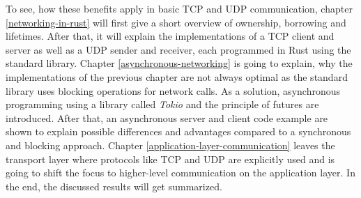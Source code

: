 To see, how these benefits apply in basic TCP and UDP communication, chapter \ref{networking-in-rust} will first give a
short overview of ownership, borrowing and lifetimes. After that, it will explain the implementations of a TCP client
and server as well as a UDP sender and receiver, each programmed in Rust using the standard library. Chapter
\ref{asynchronous-networking} is going to explain, why the implementations of the previous chapter are not always
optimal as the standard library uses blocking operations for network calls. As a solution, asynchronous programming
using a library called \textit{Tokio} and the principle of futures are introduced. After that, an asynchronous server
and client code example are shown to explain possible differences and advantages compared to a synchronous and blocking
approach. Chapter \ref{application-layer-communication} leaves the transport layer where protocols like TCP and UDP are
explicitly used and is going to shift the focus to higher-level communication on the application layer. In the end,
the discussed results will get summarized.
